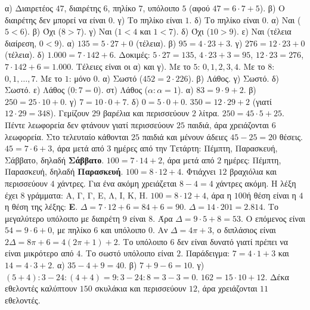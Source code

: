  α) Διαιρετέος $47$, διαιρέτης $6$, πηλίκο $7$, υπόλοιπο $5$ (αφού $47=6\cdot 7+5$). β) Ο διαιρέτης δεν μπορεί να είναι $0$. γ) Το πηλίκο είναι $1$. δ) Το πηλίκο είναι $0$.
 α) Ναι ($5<6$). β) Όχι ($8>7$). γ) Ναι ($1<4$ και $1<7$). δ) Όχι ($10>9$). ε) Ναι (τέλεια διαίρεση, $0<9$).
 α) $135=5\cdot 27+0$ (τέλεια). β) $95=4\cdot 23+3$. γ) $276=12\cdot 23+0$ (τέλεια). δ) $1.000=7\cdot 142+6$. Δοκιμές: $5\cdot 27=135$, $4\cdot 23+3=95$, $12\cdot 23=276$, $7\cdot 142+6=1.000$. Τέλειες είναι οι α) και γ).
 Με το $5$: $0,1,2,3,4$. Με το $8$: $0,1,\dots,7$. Με το $1$: μόνο $0$.
 α) Σωστό ($452=2\cdot 226$). β) Λάθος. γ) Σωστό. δ) Σωστό. ε) Λάθος ($0:7=0$). στ) Λάθος ($\alpha:\alpha=1$).
 α) $83=9\cdot 9+2$. β) $250=25\cdot 10+0$. γ) $7=10\cdot 0+7$. δ) $0=5\cdot 0+0$.
 $350=12\cdot 29+2$ (γιατί $12\cdot 29=348$). Γεμίζουν $29$ βαρέλια και περισσεύουν $2$ λίτρα.
 $250=45\cdot 5+25$. Πέντε λεωφορεία δεν φτάνουν γιατί περισσεύουν $25$ παιδιά, άρα χρειάζονται $6$ λεωφορεία. Στο τελευταίο κάθονται $25$ παιδιά και μένουν άδειες $45-25=20$ θέσεις.
 $45=7\cdot 6+3$, άρα μετά από $3$ ημέρες από την Τετάρτη: Πέμπτη, Παρασκευή, Σάββατο, δηλαδή \textbf{Σάββατο}. $100=7\cdot 14+2$, άρα μετά από $2$ ημέρες: Πέμπτη, Παρασκευή, δηλαδή \textbf{Παρασκευή}.
 $100=8\cdot 12+4$. Φτιάχνει $12$ βραχιόλια και περισσεύουν $4$ χάντρες. Για ένα ακόμη χρειάζεται $8-4=4$ χάντρες ακόμη.
 Η λέξη έχει $8$ γράμματα: Α, Γ, Γ, Ε, Λ, Ι, Κ, Η. $100=8\cdot 12+4$, άρα η $100$ή θέση είναι η $4$η θέση της λέξης: \textbf{Ε}.
 $\Delta=7\cdot 12+6=84+6=90$.
 $\Delta=14\cdot 201=2.814$.
 Το μεγαλύτερο υπόλοιπο με διαιρέτη $9$ είναι $8$. Άρα $\Delta=9\cdot 5+8=53$. Ο επόμενος είναι $54=9\cdot 6+0$, με πηλίκο $6$ και υπόλοιπο $0$.
 Αν $\Delta=4\pi+3$, ο διπλάσιος είναι $2\Delta=8\pi+6=4(2\pi+1)+2$. Το υπόλοιπο $6$ δεν είναι δυνατό γιατί πρέπει να είναι μικρότερο από $4$. Το σωστό υπόλοιπο είναι $2$. Παράδειγμα: $7=4\cdot 1+3$ και $14=4\cdot 3+2$.
 α) $35-4+9=40$. β) $7+9-6=10$. γ) $(5+4):3-24:(4+4)=9:3-24:8=3-3=0$.
 $162=15\cdot 10+12$. Δέκα εθελοντές καλύπτουν $150$ σκυλάκια και περισσεύουν $12$, άρα χρειάζονται $11$ εθελοντές.
